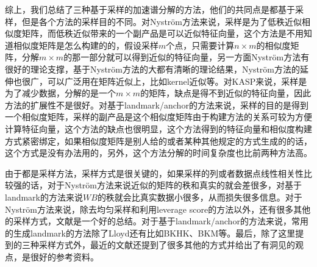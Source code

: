 综上，我们总结了三种基于采样的加速谱分解的方法，他们的共同点是都基于采样，但是各个方法的采样目的不同。对Nyström方法来说，采样是为了低秩近似相似度矩阵，而低秩近似带来的一个副产品是可以近似特征向量，这个方法是不用知道相似度矩阵是怎么构建的的，假设采样$m$个点，只需要计算$n \times m$的相似度矩阵，分解$m \times m$的那一部分就可以得到近似的特征向量，另一方面Nyström方法有很好的理论支撑，基于Nyström方法的大都有清晰的理论结果，Nyström方法的延伸也很广，可以广泛用在矩阵近似上，比如kernel近似等。对KASP来说，采样是为了减少数据，分解的是一个$m \times m$的矩阵，缺点是得不到近似的特征向量，因此方法的扩展性不是很好。对基于landmark/anchor的方法来说，采样的目的是得到一个相似度矩阵，采样的副产品是这个相似度矩阵由于构建方法的关系可较为方便计算特征向量，这个方法的缺点也很明显，这个方法得到的特征向量和相似度构建方式紧密绑定，如果相似度矩阵是别人给的或者某种其他规定的方式生成的的话，这个方式是没有办法用的，另外，这个方法分解的时间复杂度也比前两种方法高。

由于都是采样方法，采样方式是很关键的，如果采样的列或者数据点线性相关性比较强的话，对于Nyström方法来说近似的矩阵的秩和真实的就会差很多，对基于landmark的方法来说$WB$的秩就会比真实数据小很多，从而损失很多信息。对于Nyström方法来说，除去均匀采样和利用leverage score的方法以外，还有很多其他的采样方式，文献\cite{kumar2012sampling}是一个好的总结。对于基于landmark/anchor的方法来说，常用的生成landmark的方法除了Lloyd还有比如BKHK、BKM等。最后，除了这里提到的三种采样方式外，最近的文献\cite{tremblay2020approximating}还提到了很多其他的方式并给出了有洞见的观点，是很好的参考资料。

